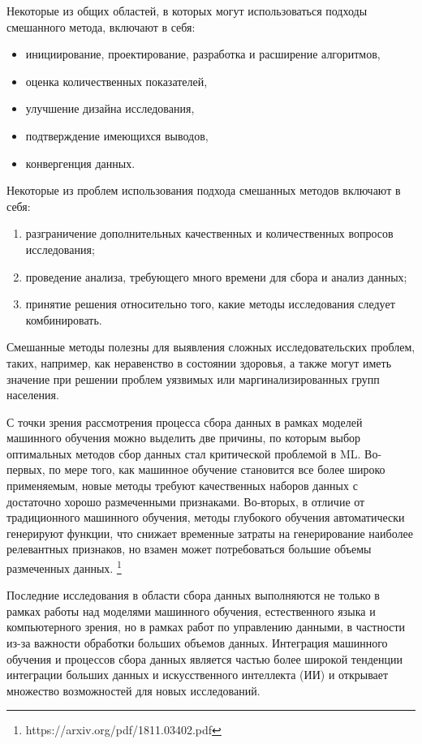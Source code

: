 \documentclass[12pt,a4paper, oneside]{extreport}
\begin{document}
Некоторые из общих областей, в которых могут использоваться подходы смешанного метода, включают в себя:

\begin{itemize}
	\item инициирование, проектирование, разработка и расширение алгоритмов,
	\item  оценка количественных показателей, 
	\item  улучшение дизайна исследования,
	\item  подтверждение имеющихся  выводов, 
	\item  конвергенция данных. 
\end{itemize} 

Некоторые из проблем использования подхода смешанных методов включают в себя:

\begin{enumerate}
	\item разграничение дополнительных качественных и количественных вопросов исследования;
	\item проведение анализа,  требующего  много времени для сбора и анализ данных; 
	\item  принятие решения относительно того, какие методы исследования следует комбинировать. 	
\end{enumerate}

Смешанные методы полезны для выявления сложных исследовательских проблем, таких, например,  как неравенство в состоянии здоровья, а также могут иметь значение при решении проблем уязвимых или маргинализированных групп населения. 


С точки зрения рассмотрения процесса сбора  данных в рамках моделей машинного обучения можно выделить две причины, по которым выбор оптимальных методов  сбор данных стал критической проблемой в ML. Во-первых, по мере того, как машинное обучение становится все более широко применяемым, новые методы требуют качественных наборов данных с достаточно хорошо  размеченными признаками. Во-вторых, в отличие от традиционного машинного обучения, методы глубокого обучения автоматически генерируют функции, что снижает временные  затраты на генерирование наиболее  релевантных  признаков, но взамен может потребоваться  большие  объемы  размеченных данных. \footnote{https://arxiv.org/pdf/1811.03402.pdf}

Последние исследования в области сбора данных выполняются не только в рамках работы над моделями машинного обучения, естественного языка и компьютерного зрения, но в рамках работ по управлению  данными, в частности из-за важности обработки больших объемов данных. 
Интеграция машинного обучения и процессов  сбора данных является частью более широкой тенденции интеграции больших данных и искусственного интеллекта (ИИ) и открывает множество возможностей для новых исследований.
\end{document}
